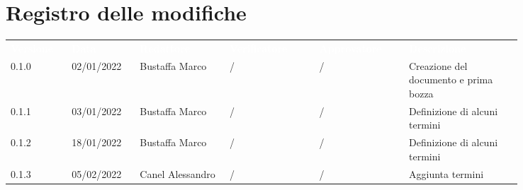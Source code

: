 \section*{Registro delle modifiche}

{\renewcommand{\arraystretch}{1.5}
\scriptsize
\begin{tabular}{p{0.10\linewidth}p{0.10\linewidth}p{0.15\linewidth}p{0.15\linewidth}p{0.15\linewidth}p{0.19\linewidth}}
	\rowcolor[RGB]{33, 73, 50}
	\textcolor{white}{\textbf{Versione}} & \textcolor{white}{\textbf{Data}} &
	\textcolor{white}{\textbf{Redattore}} & \textcolor{white}{\textbf{Verificatore}} &
	\textcolor{white}{\textbf{Approvatore}} & \textcolor{white}{\textbf{Descrizione}}\\
	\rowcolor[RGB]{216, 235, 171}
	0.1.0 & 02/01/2022 & Bustaffa Marco & / &/& Creazione del documento e prima bozza\\
	\rowcolor[RGB]{233, 245, 206}
	0.1.1 & 03/01/2022 & Bustaffa Marco & / &/& Definizione di alcuni termini\\
	\rowcolor[RGB]{216, 235, 171}
	0.1.2 & 18/01/2022 & Bustaffa Marco & / &/& Definizione di alcuni termini\\
	\rowcolor[RGB]{233, 245, 206}
	0.1.3 & 05/02/2022 & Canel Alessandro & / &/& Aggiunta termini\\

\end{tabular}
}

